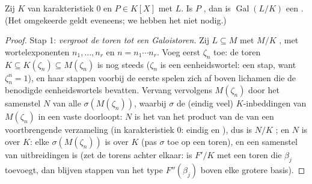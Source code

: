 \begin{theorem}[Galois]\label{thm:b3:galois:solvable}
Zij $K$ van karakteristiek $0$ en $P \in K[X]$ met
 $L$. Is $P$ , dan
is $\operatorname{Gal}(L/K)$ een . (Het omgekeerde
geldt eveneens; we hebben het niet nodig.)
\end{theorem}

\begin{proof}
Stap 1: \emph{vergroot de  toren tot een Galoistoren.} Zij
$L \subseteq M$ met $M/K$ , met wortelexponenten $n_1,
\dots, n_r$ en $n = n_1\cdots n_r$. Voeg eerst $\zeta_n$ toe: de
toren $K \subseteq K(\zeta_n) \subseteq M(\zeta_n)$ is nog steeds
 ($\zeta_n$ is een eenheidswortel: een  stap, want
$\zeta_n^n = 1$), en haar stappen voorbij de eerste spelen zich af
boven lichamen die de benodigde eenheidswortels bevatten. Vervang
vervolgens $M(\zeta_n)$ door het samenstel $N$ van alle
$\sigma(M(\zeta_n))$, waarbij $\sigma$ de (eindig veel)
$K$-inbeddingen van $M(\zeta_n)$ in een vaste  doorloopt: $N$ is het  van het product
van de  van een voortbrengende verzameling (in
karakteristiek $0$: eindig en ), dus is $N/K$ ; en
$N$ is  over $K$: elke $\sigma(M(\zeta_n))$ is 
over $K$ (pas $\sigma$ toe op een  toren), en een
samenstel van  uitbreidingen is  (zet de torens
achter elkaar: is $F'/K$  met een toren die $\beta_j$
toevoegt, dan blijven stappen van het type $F''(\beta_j)$ 
boven elke grotere basis).


\end{proof}
